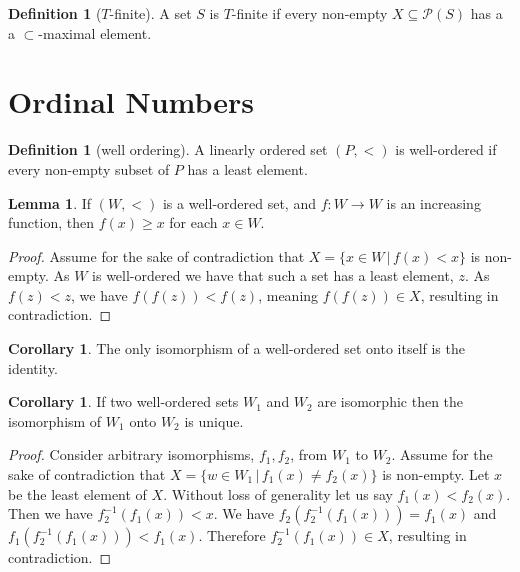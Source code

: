 \documentclass{article}
\theoremstyle{definition}
\newtheorem{crly}[thm]{Corollary}
\newtheorem{defn}[thm]{Definition}
\newtheorem{lmma}[thm]{Lemma}
\newcommand{\powset}[1]{\mathcal{P}(#1)}
\begin{document}
\begin{defn}[$T$-finite]
    A set $S$ is $T$-finite if every non-empty $X \subseteq \powset{S}$ has a a $\subset$-maximal element.
\end{defn}

\section{Ordinal Numbers}

\begin{defn}[well ordering]
    A linearly ordered set $(P, <)$ is well-ordered if every non-empty subset of $P$ has a least element.
\end{defn}

\begin{lmma}
    If $(W, <)$ is a well-ordered set, and $f: W \to W$ is an increasing function, then $f(x) \ge x$ for each $x \in W$.
\end{lmma}

\begin{proof}
    Assume for the sake of contradiction that $X = \{x \in W \, | \, f(x) < x\}$ is non-empty. As $W$ is well-ordered we have that such a set has a least element, $z$. As $f(z) < z$, we have $f(f(z)) < f(z)$, meaning $f(f(z)) \in X$, resulting in contradiction.
\end{proof}

\begin{crly}
    The only isomorphism of a well-ordered set onto itself is the identity.
\end{crly}

\begin{crly}
    If two well-ordered sets $W_1$ and $W_2$ are isomorphic then the isomorphism of $W_1$ onto $W_2$ is unique.
\end{crly}

\begin{proof}
    Consider arbitrary isomorphisms, $f_1, f_2$, from $W_1$ to $W_2$. Assume for the sake of contradiction that $X = \{w \in W_1 \, | \, f_1(x) \ne f_2(x) \}$ is non-empty. Let $x$ be the least element of $X$. Without loss of generality let us say $f_1(x) < f_2(x)$. Then we have $f_{2}^{-1}(f_1(x)) < x$. We have $f_{2}(f_{2}^{-1}(f_1(x))) = f_1(x)$ and $f_1(f_{2}^{-1}(f_1(x))) < f_1(x)$. Therefore $f_{2}^{-1}(f_1(x)) \in X$, resulting in contradiction. 
\end{proof}
\end{document}
